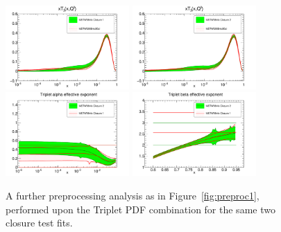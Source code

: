 \clearpage
\begin{figure}[!]
\centering
\includegraphics[width=0.42\textwidth]{7-PostLHC/figs/Preproc1/pdf_xT3_log_others.pdf}
\includegraphics[width=0.42\textwidth]{7-PostLHC/figs/Preproc2/pdf_xT3_log_others.pdf}
\includegraphics[width=0.42\textwidth]{7-PostLHC/figs/Preproc2/alphapreproc_3.pdf}
\includegraphics[width=0.42\textwidth]{7-PostLHC/figs/Preproc2/betapreproc_3.pdf}
\caption[Demonstration of the impact made by changes in preprocessing to the triplet PDF in a closure test fit]{A further preprocessing analysis as in Figure~\ref{fig:preproc1}, performed upon the Triplet PDF combination for the same two closure test fits.}
\label{fig:preproc2}
\end{figure}

